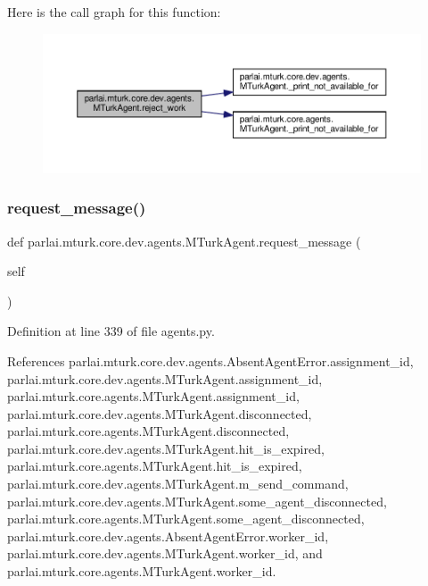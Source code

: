 Here is the call graph for this function\+:
\nopagebreak
\begin{figure}[H]
\begin{center}
\leavevmode
\includegraphics[width=350pt]{classparlai_1_1mturk_1_1core_1_1dev_1_1agents_1_1MTurkAgent_a5f3d74f332376039cd349ab7159e0b4c_cgraph}
\end{center}
\end{figure}
\mbox{\label{classparlai_1_1mturk_1_1core_1_1dev_1_1agents_1_1MTurkAgent_aac39e834ecff137bc0cfbb584c4d6c7f}} 
\subsubsection{\texorpdfstring{request\+\_\+message()}{request\_message()}}
{\footnotesize\ttfamily def parlai.\+mturk.\+core.\+dev.\+agents.\+M\+Turk\+Agent.\+request\+\_\+message (\begin{DoxyParamCaption}\item[{}]{self }\end{DoxyParamCaption})}



Definition at line 339 of file agents.\+py.



References parlai.\+mturk.\+core.\+dev.\+agents.\+Absent\+Agent\+Error.\+assignment\+\_\+id, parlai.\+mturk.\+core.\+dev.\+agents.\+M\+Turk\+Agent.\+assignment\+\_\+id, parlai.\+mturk.\+core.\+agents.\+M\+Turk\+Agent.\+assignment\+\_\+id, parlai.\+mturk.\+core.\+dev.\+agents.\+M\+Turk\+Agent.\+disconnected, parlai.\+mturk.\+core.\+agents.\+M\+Turk\+Agent.\+disconnected, parlai.\+mturk.\+core.\+dev.\+agents.\+M\+Turk\+Agent.\+hit\+\_\+is\+\_\+expired, parlai.\+mturk.\+core.\+agents.\+M\+Turk\+Agent.\+hit\+\_\+is\+\_\+expired, parlai.\+mturk.\+core.\+dev.\+agents.\+M\+Turk\+Agent.\+m\+\_\+send\+\_\+command, parlai.\+mturk.\+core.\+dev.\+agents.\+M\+Turk\+Agent.\+some\+\_\+agent\+\_\+disconnected, parlai.\+mturk.\+core.\+agents.\+M\+Turk\+Agent.\+some\+\_\+agent\+\_\+disconnected, parlai.\+mturk.\+core.\+dev.\+agents.\+Absent\+Agent\+Error.\+worker\+\_\+id, parlai.\+mturk.\+core.\+dev.\+agents.\+M\+Turk\+Agent.\+worker\+\_\+id, and parlai.\+mturk.\+core.\+agents.\+M\+Turk\+Agent.\+worker\+\_\+id.



